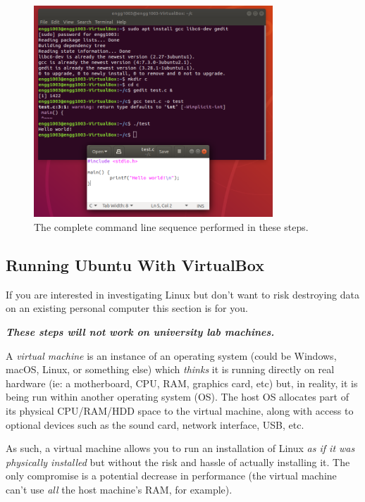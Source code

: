 \documentclass{lab}
\begin{document}
\begin{figure}[H]
\begin{center}
\includegraphics[width=0.8\textwidth]{c_ubuntu.png}
\end{center}
\caption{The complete command line sequence performed in these steps.}\label{fig:c_ubuntu}
\end{figure}

\pagebreak
\subsection{Running Ubuntu With VirtualBox}\label{sec:virtualbox}

If you are interested in investigating Linux but don't want to risk destroying data on an existing personal computer this section is for you.

\textbf{\textit{These steps will not work on university lab machines.}}

A \textit{virtual machine} is an instance of an operating system (could be Windows, macOS, Linux, or something else) which \textit{thinks} it is running directly on real hardware (ie: a motherboard, CPU, RAM, graphics card, etc) but, in reality, it is being run within another operating system (OS). The host OS allocates part of its physical CPU/RAM/HDD space to the virtual machine, along with access to optional devices such as the sound card, network interface, USB, etc.

As such, a virtual machine allows you to run an installation of Linux \textit{as if it was physically installed} but without the risk and hassle of actually installing it. The only compromise is a potential decrease in performance (the virtual machine can't use \textit{all} the host machine's RAM, for example).
\end{document}
